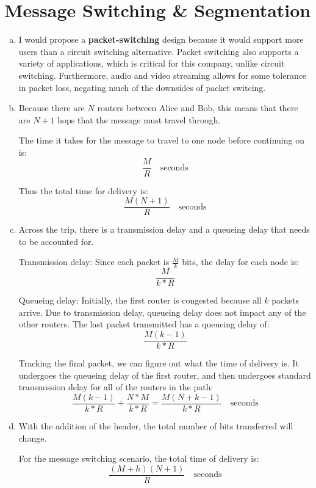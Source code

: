 \documentclass[11pt]{article}
\begin{document}
\section*{Message Switching \& Segmentation}
  \begin{enumerate}[(a)]
    \item
      I would propose a \textbf{packet-switching} design because it would support more
      users than a circuit switching alternative. Packet switching also supports a variety
      of applications, which is critical for this company, unlike circuit switching.
      Furthermore, audio and video streaming allows for some tolerance in packet loss,
      negating much of the downsides of packet switcing.
    \item
      Because there are $N$ routers between Alice and Bob, this means that there are $N+1$
      hops that the message must travel through.

      The time it takes for the message to travel to one node before continuing on is:
      \[ \frac{M}{R} \quad \text{seconds} \]

      Thus the total time for delivery is:
      \[ \frac{M(N+1)}{R} \quad \text{seconds} \]
    \item
      Across the trip, there is a transmission delay and a queueing delay that needs to be
      accounted for.

      Transmission delay: Since each packet is $\frac{M}{k}$ bits, the delay for each node is:
      \[ \frac{M}{k * R} \]

      Queueing delay: Initially, the first router is congested because all $k$ packets
      arrive. Due to transmission delay, queueing delay does not impact any of the other
      routers. The last packet transmitted has a queueing delay of:
      \[ \frac{M(k-1)}{k * R} \]

      Tracking the final packet, we can figure out what the time of delivery is.
      It undergoes the queueing delay of the first router, and then undergoes
      standard transmission delay for all of the routers in the path:
      \[ \frac{M(k-1)}{k * R} + \frac{N * M}{k * R} = \boxed{\frac{M(N + k - 1)}{k * R} \quad \text{seconds}} \]
    \item
      With the addition of the header, the total number of bits transferred will change.

      For the message switching scenario, the total time of delivery is:
      \[ \frac{(M + h)(N+1)}{R} \quad \text{seconds} \]


\end{enumerate}
\end{document}
